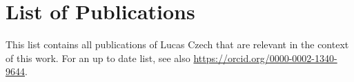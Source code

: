 
\cleardoublepage
\pagestyle{plain}

\chapter*{List of Publications}
\label{ch:Publications}

This list contains all publications of Lucas Czech that are relevant in the context of this work.
For an up to date list, see also \url{https://orcid.org/0000-0002-1340-9644}.




% 

